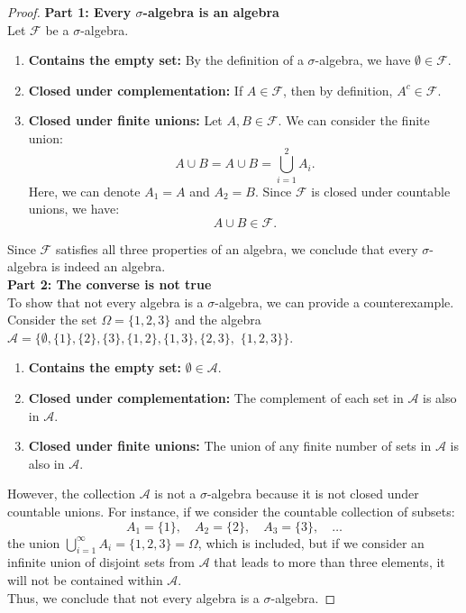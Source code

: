 \begin{proof}
    
\textbf{Part 1: Every $\sigma$-algebra is an algebra}\\

Let $\mathcal{F}$ be a $\sigma$-algebra.

\begin{enumerate}
    \item \textbf{Contains the empty set:} By the definition of a $\sigma$-algebra, we have $\emptyset \in \mathcal{F}$.
    
    \item \textbf{Closed under complementation:} If $A \in \mathcal{F}$, then by definition, $A^c \in \mathcal{F}$.
    
    \item \textbf{Closed under finite unions:} Let $A, B \in \mathcal{F}$. We can consider the finite union:
    \[
    A \cup B = A \cup B = \bigcup_{i=1}^{2} A_i.
    \]
    Here, we can denote $A_1 = A$ and $A_2 = B$. Since $\mathcal{F}$ is closed under countable unions, we have:
    \[
    A \cup B \in \mathcal{F}.
    \]
\end{enumerate}

Since $\mathcal{F}$ satisfies all three properties of an algebra, we conclude that every $\sigma$-algebra is indeed an algebra.\\

\textbf{Part 2: The converse is not true}\\

To show that not every algebra is a $\sigma$-algebra, we can provide a counterexample.\\

Consider the set $\Omega = \{1, 2, 3\}$ and the algebra $\mathcal{A} = \{ \emptyset, \{1\}, \{2\}, \{3\}, \{1, 2\}, \{1, 3\}, \{2, 3\},$
$ \{1, 2, 3\} \}$.

\begin{enumerate}
    \item \textbf{Contains the empty set:} $\emptyset \in \mathcal{A}$.
    
    \item \textbf{Closed under complementation:} The complement of each set in $\mathcal{A}$ is also in $\mathcal{A}$.
    
    \item \textbf{Closed under finite unions:} The union of any finite number of sets in $\mathcal{A}$ is also in $\mathcal{A}$.
\end{enumerate}

However, the collection $\mathcal{A}$ is not a $\sigma$-algebra because it is not closed under countable unions. For instance, if we consider the countable collection of subsets:
\[
A_1 = \{1\}, \quad A_2 = \{2\}, \quad A_3 = \{3\}, \quad \ldots
\]
the union $\bigcup_{i=1}^{\infty} A_i = \{1, 2, 3\} = \Omega$, which is included, but if we consider an infinite union of disjoint sets from $\mathcal{A}$ that leads to more than three elements, it will not be contained within $\mathcal{A}$.\\

Thus, we conclude that not every algebra is a $\sigma$-algebra.
\end{proof}

